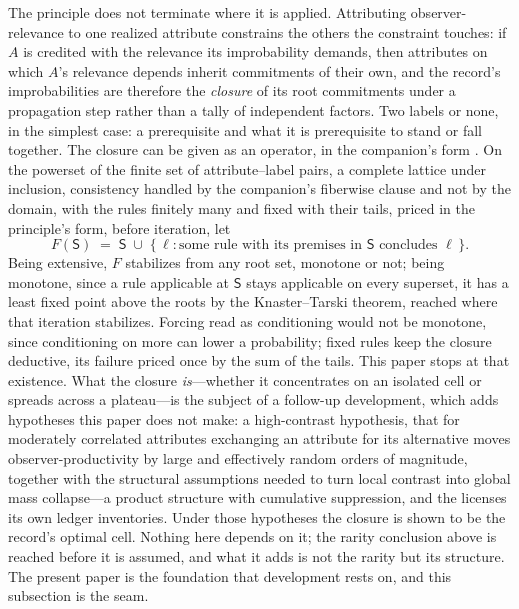The principle does not terminate where it is applied. Attributing observer-relevance to one realized attribute constrains the others the constraint touches: if $A$ is credited with the relevance its improbability demands, then attributes on which $A$'s relevance depends inherit commitments of their own, and the record's improbabilities are therefore the \emph{closure} of its root commitments under a propagation step rather than a tally of independent factors. Two labels or none, in the simplest case: a prerequisite and what it is prerequisite to stand or fall together. The closure can be given as an operator, in the companion's form \cite{Nexus}. On the powerset of the finite set of attribute--label pairs, a complete lattice under inclusion, consistency handled by the companion's fiberwise clause and not by the domain, with the rules finitely many and fixed with their tails, priced in the principle's form, before iteration, let
\begin{equation}
\label{eq:closure-operator}
F(\mathsf{S}) \;=\; \mathsf{S} \;\cup\; \{\, \ell : \text{some rule with its premises in } \mathsf{S} \text{ concludes } \ell \,\}.
\end{equation}
Being extensive, $F$ stabilizes from any root set, monotone or not; being monotone, since a rule applicable at $\mathsf{S}$ stays applicable on every superset, it has a least fixed point above the roots by the Knaster--Tarski theorem, reached where that iteration stabilizes. Forcing read as conditioning would not be monotone, since conditioning on more can lower a probability; fixed rules keep the closure deductive, its failure priced once by the sum of the tails. This paper stops at that existence. What the closure \emph{is}---whether it concentrates on an isolated cell or spreads across a plateau---is the subject of a follow-up development, which adds hypotheses this paper does not make: a high-contrast hypothesis, that for moderately correlated attributes exchanging an attribute for its alternative moves observer-productivity by large and effectively random orders of magnitude, together with the structural assumptions needed to turn local contrast into global mass collapse---a product structure with cumulative suppression, and the licenses its own ledger inventories. Under those hypotheses the closure is shown to be the record's optimal cell. Nothing here depends on it; the rarity conclusion above is reached before it is assumed, and what it adds is not the rarity but its structure. The present paper is the foundation that development rests on, and this subsection is the seam.

